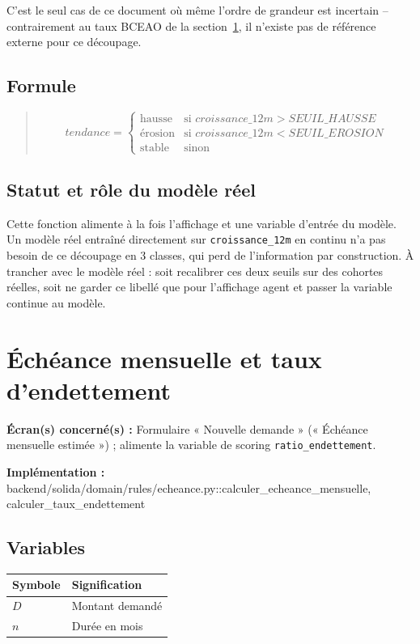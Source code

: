 \documentclass[11pt,a4paper]{article}
\newcommand{\brk}{\allowbreak}
\newcommand{\ecran}[1]{\noindent\textbf{Écran(s) concerné(s) :} #1\par}
\newcommand{\fichier}[1]{\noindent\textbf{Implémentation :} \tiny\ttfamily#1\normalfont\normalsize\par}
\newenvironment{formule}{\begin{quote}}{\end{quote}}
\begin{document}
C'est le seul cas de ce document où même l'ordre de grandeur est incertain -- contrairement au
taux BCEAO de la section~\ref{sec:echeance}, il n'existe pas de référence externe pour ce
découpage.

\subsection*{Formule}
\begin{formule}
\[
\mathit{tendance} =
\begin{cases}
\text{hausse} & \text{si } \mathit{croissance\_12m} > \mathit{SEUIL\_HAUSSE} \\
\text{érosion} & \text{si } \mathit{croissance\_12m} < \mathit{SEUIL\_EROSION} \\
\text{stable} & \text{sinon}
\end{cases}
\]
\end{formule}

\subsection*{Statut et rôle du modèle réel}
Cette fonction alimente à la fois l'affichage et une variable d'entrée du modèle. Un modèle réel
entraîné directement sur \texttt{croissance\_12m} en continu n'a pas besoin de ce découpage en 3
classes, qui perd de l'information par construction. À trancher avec le modèle réel : soit
recalibrer ces deux seuils sur des cohortes réelles, soit ne garder ce libellé que pour
l'affichage agent et passer la variable continue au modèle.

\newpage

\section{Échéance mensuelle et taux d'endettement}
\label{sec:echeance}

\ecran{Formulaire « Nouvelle demande » (« Échéance mensuelle estimée ») ; alimente la variable de
scoring \texttt{ratio\_endettement}.}
\fichier{backend/\brk solida/\brk domain/\brk rules/\brk echeance.py::\brk{}calculer\_echeance\_mensuelle, calculer\_taux\_endettement}

\subsection*{Variables}

\begin{tabular}{@{}lL{9.5cm}@{}}
\toprule
Symbole & Signification \\
\midrule
$D$ & Montant demandé \\
$n$ & Durée en mois \\
\bottomrule
\end{tabular}
\end{document}
